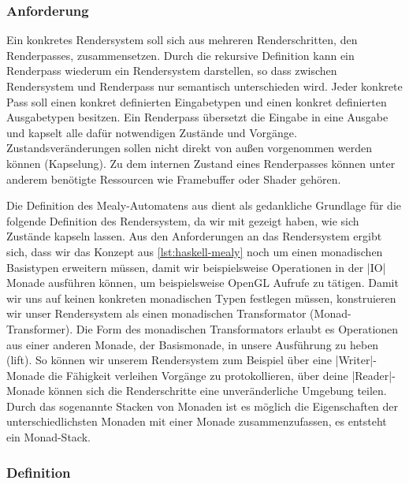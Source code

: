\subsubsection{Anforderung}
Ein konkretes Rendersystem soll sich aus mehreren  Renderschritten, den Renderpasses, zusammensetzen. Durch die rekursive Definition kann ein Renderpass wiederum ein Rendersystem darstellen, so dass zwischen Rendersystem und Renderpass nur semantisch unterschieden wird. Jeder konkrete Pass soll einen konkret definierten Eingabetypen und einen konkret definierten Ausgabetypen besitzen. Ein Renderpass übersetzt die Eingabe in eine Ausgabe und kapselt alle dafür notwendigen Zustände und Vorgänge. Zustandsveränderungen sollen nicht direkt von außen vorgenommen werden können (Kapselung). Zu dem internen Zustand eines Renderpasses können unter anderem benötigte Ressourcen wie Framebuffer oder Shader gehören. 

Die Definition des Mealy-Automatens aus dient als gedankliche Grundlage für die folgende Definition des Rendersystem, da wir mit  gezeigt haben, wie sich Zustände kapseln lassen. Aus den Anforderungen an das Rendersystem ergibt sich, dass wir das Konzept aus \ref{lst:haskell-mealy} noch um einen monadischen Basistypen erweitern müssen, damit wir beispielsweise Operationen in der |IO| Monade ausführen können, um beispielsweise OpenGL Aufrufe zu tätigen. Damit wir uns auf keinen konkreten monadischen Typen festlegen müssen, konstruieren wir unser Rendersystem als einen monadischen Transformator (Monad-Transformer). Die Form des monadischen Transformators erlaubt es Operationen aus einer anderen Monade, der Basismonade, in unsere Ausführung zu heben (lift). So können wir unserem Rendersystem zum Beispiel über eine |Writer|-Monade die Fähigkeit verleihen Vorgänge zu protokollieren, über deine |Reader|-Monade können sich die Renderschritte eine unveränderliche Umgebung teilen. Durch das sogenannte Stacken von Monaden ist es möglich die Eigenschaften der unterschiedlichsten Monaden mit einer Monade zusammenzufassen, es entsteht ein Monad-Stack.

\subsubsection{Definition}

